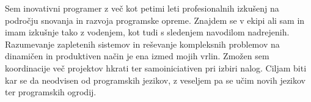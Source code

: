 

\begin{cvparagraph}

Sem inovativni programer z več kot petimi leti profesionalnih izkušenj 
na področju snovanja in razvoja programske opreme.
Znajdem se v ekipi ali sam in imam izkušnje tako z vodenjem, 
kot tudi s sledenjem navodilom nadrejenih.
Razumevanje zapletenih sistemov in reševanje kompleksnih problemov 
na dinamičen in produktiven način je ena izmed mojih vrlin.
Zmožen sem koordinacije več projektov hkrati ter samoiniciativen 
pri izbiri nalog.
Ciljam biti kar se da neodvisen od programskih jezikov, 
z veseljem pa se učim novih jezikov ter programskih ogrodij.
\end{cvparagraph}
